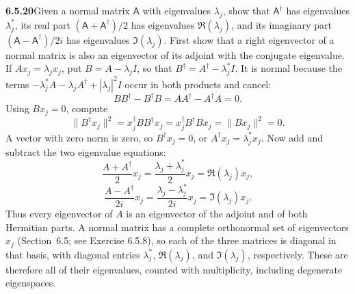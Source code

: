 \par\bigskip
\noindent\textbf{6.5.20}\quad Given a normal matrix $\mathsf{A}$ with
eigenvalues $\lambda_{j}$, show that $\mathsf{A}^{\dagger}$ has eigenvalues
$\lambda_{j}^{*}$, its real part $(\mathsf{A}+\mathsf{A}^{\dagger})/2$ has
eigenvalues $\Re(\lambda_{j})$, and its imaginary part
$(\mathsf{A}-\mathsf{A}^{\dagger})/2i$ has eigenvalues $\Im(\lambda_{j})$.
\solution
First show that a right eigenvector of a normal matrix is also an
eigenvector of its adjoint with the conjugate eigenvalue. If
$Ax_j=\lambda_jx_j$, put $B=A-\lambda_jI$, so that
$B^\dagger=A^\dagger-\lambda_j^*I$. It is normal because the terms
$-\lambda_j^*A-\lambda_jA^\dagger+|\lambda_j|^2I$ occur in both products
and cancel:
\[
BB^\dagger-B^\dagger B=AA^\dagger-A^\dagger A=0.
\]
Using $Bx_j=0$, compute
\[
\|B^\dagger x_j\|^2
=x_j^\dagger BB^\dagger x_j
=x_j^\dagger B^\dagger Bx_j
=\|Bx_j\|^2=0.
\]
A vector with zero norm is zero, so
$B^\dagger x_j=0$, or $\boxed{A^\dagger x_j=\lambda_j^*x_j}$.
Now add and subtract the two eigenvalue equations:
\[
\frac{A+A^\dagger}{2}x_j
=\frac{\lambda_j+\lambda_j^*}{2}x_j
=\boxed{\Re(\lambda_j)x_j},
\]
\[
\frac{A-A^\dagger}{2i}x_j
=\frac{\lambda_j-\lambda_j^*}{2i}x_j
=\boxed{\Im(\lambda_j)x_j}.
\]
Thus every eigenvector of $A$ is an eigenvector of the adjoint and of
both Hermitian parts. A normal matrix has a complete orthonormal set of
eigenvectors $x_j$ (Section~6.5; see Exercise 6.5.8), so each of the
three matrices is diagonal in that basis, with diagonal entries
$\lambda_j^*$, $\Re(\lambda_j)$, and $\Im(\lambda_j)$, respectively.
These are therefore all of their eigenvalues, counted with
multiplicity, including degenerate eigenspaces.

